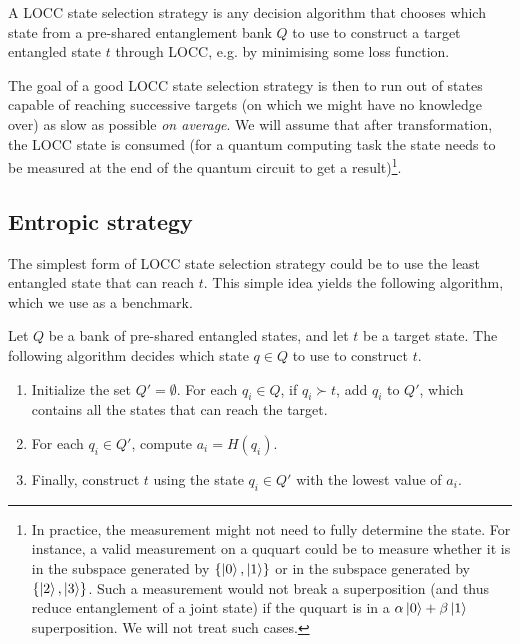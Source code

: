 \begin{definition}
    A LOCC state selection strategy is any decision algorithm that chooses which state from a pre-shared entanglement bank $Q$ to use to construct a target entangled state $t$ through LOCC, e.g. by minimising some loss function.
\end{definition}

The goal of a good LOCC state selection strategy is then to run out of states capable of reaching successive targets (on which we might have no knowledge over) as slow as possible \textit{on average}. We will assume that after transformation, the LOCC state is consumed (for a quantum computing task the state needs to be measured at the end of the quantum circuit to get a result)\footnote{In practice, the measurement might not need to fully determine the state. For instance, a valid measurement on a ququart could be to measure whether it is in the subspace generated by $\{\ket{0}, \ket{1}\}$ or in the subspace generated by $\{\ket{2}, \ket{3}\}$. Such a measurement would not break a superposition (and thus reduce entanglement of a joint state) if the ququart is in a $\alpha\ket{0} + \beta\ket{1}$ superposition. We will not treat such cases.}.



\subsection{Entropic strategy}

The simplest form of LOCC state selection strategy could be to use the least entangled state that can reach $t$. This simple idea yields the following algorithm, which we use as a benchmark.

\begin{definition}
    Let $Q$ be a bank of pre-shared entangled states, and let $t$ be a target state. The following algorithm decides which state $q \in Q$ to use to construct $t$.
    \begin{enumerate}
        \item Initialize the set $Q' = \emptyset$. For each $q_i \in Q$, if $q_i \succ t$, add $q_i$ to $Q'$, which contains all the states that can reach the target.
        \item For each $q_i \in Q'$, compute $a_i = H(q_i)$.
        \item Finally, construct $t$ using the state $q_i \in Q'$ with the lowest value of $a_i$.
    \end{enumerate}
\end{definition}

